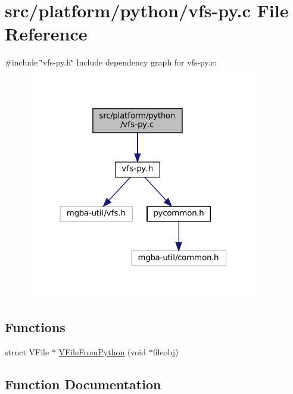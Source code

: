 \hypertarget{vfs-py_8c}{}\section{src/platform/python/vfs-\/py.c File Reference}
\label{vfs-py_8c}
{\ttfamily \#include \char`\"{}vfs-\/py.\+h\char`\"{}}\newline
Include dependency graph for vfs-\/py.c\+:
\nopagebreak
\begin{figure}[H]
\begin{center}
\leavevmode
\includegraphics[width=289pt]{vfs-py_8c__incl}
\end{center}
\end{figure}
\subsection*{Functions}
\begin{DoxyCompactItemize}
\item 
struct V\+File $\ast$ \mbox{\hyperlink{vfs-py_8c_a2c8828e68e769f2b3de7641e6d12feea}{V\+File\+From\+Python}} (void $\ast$fileobj)
\end{DoxyCompactItemize}


\subsection{Function Documentation}
\mbox{\label{vfs-py_8c_a2c8828e68e769f2b3de7641e6d12feea}} 
